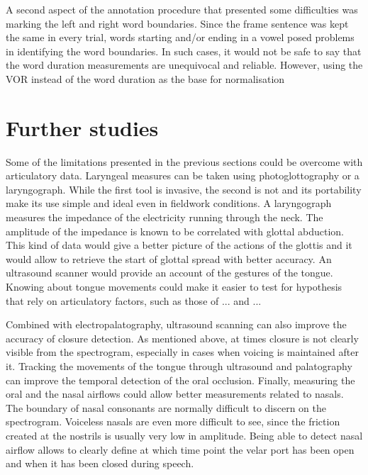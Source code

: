 \documentclass[11pt,a4paper,openany]{memoir}\usepackage[]{graphicx}\usepackage[]{color}
\begin{document}
A second aspect of the annotation procedure that presented some difficulties was marking the left and right word boundaries.
Since the frame sentence was kept the same in every trial, words starting and/or ending in a vowel posed problems in identifying the word boundaries.
In such cases, it would not be safe to say that the word duration measurements are unequivocal and reliable.
However, using the VOR instead of the word duration as the base for normalisation 



\section{Further studies}

Some of the limitations presented in the previous sections could be overcome with articulatory data.
Laryngeal measures can be taken using photoglottography or a laryngograph.
While the first tool is invasive, the second is not and its portability make its use simple and ideal even in fieldwork conditions.
A laryngograph measures the impedance of the electricity running through the neck.
The amplitude of the impedance is known to be correlated with glottal abduction.
This kind of data would give a better picture of the actions of the glottis and it would allow to retrieve the start of glottal spread with better accuracy.
An ultrasound scanner would provide an account of the gestures of the tongue.
Knowing about tongue movements could make it easier to test for hypothesis that rely on articulatory factors, such as those of ... and ...

Combined with electropalatography, ultrasound scanning can also improve the accuracy of closure detection.
As mentioned above, at times closure is not clearly visible from the spectrogram, especially in cases when voicing is maintained after it.
Tracking the movements of the tongue through ultrasound and palatography can improve the temporal detection of the oral occlusion.
Finally, measuring the oral and the nasal airflows could allow better measurements related to nasals.
The boundary of nasal consonants are normally difficult to discern on the spectrogram.
Voiceless nasals are even more difficult to see, since the friction created at the nostrils is usually very low in amplitude.
Being able to detect nasal airflow allows to clearly define at which time point the velar port has been open and when it has been closed during speech.
















%





\appendix









\end{document}
